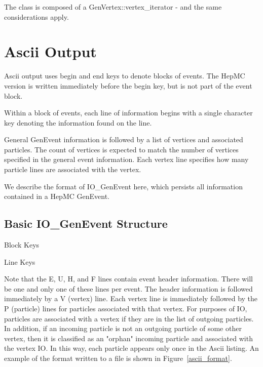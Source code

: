 \documentclass[11pt,letterpaper]{article}
\begin{document}
The class is composed of a GenVertex::vertex\_iterator - 
and the same considerations apply.

%
%

\section{Ascii Output}
\label{iogenevent}

Ascii output uses begin and end keys to denote blocks of events.
The HepMC version is written immediately before the begin key, but 
is not part of the event block.

Within a block of events, each line of information begins with a 
single character key denoting the information found on the line.

General GenEvent information is followed by a list of vertices 
and associated particles.  The count of vertices is expected to match the 
number of vertices specified in the general event information.
Each vertex line specifies how many particle lines are associated 
with the vertex.

We describe the format of IO\_GenEvent here, which persists all information
contained in a HepMC GenEvent.

%
%

\subsection{Basic IO\_GenEvent Structure}

\begin{myitemize}{Block Keys}
\end{myitemize}
\begin{myitemize}{Line Keys}
\end{myitemize}

Note that the E, U, H, and F lines contain event header information.
There will be one and only one of these lines per event. 
The header information is followed immediately by a V (vertex) line.
Each vertex line is immediately followed by the P (particle) lines 
for particles associated with that vertex.  
For purposes of IO, particles are associated with a vertex if they
are in the list of outgoing particles.
In addition, if an incoming particle is not an outgoing particle of 
some other vertex, then it is classified as an "orphan" incoming particle
and associated with the vertex IO.
In this way, each particle appears only once in the Ascii listing.
An example of the format written to a file is shown in Figure~\ref{ascii_format}.
\end{document}
